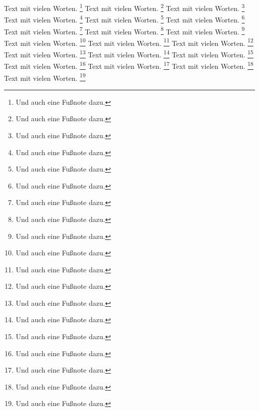 \documentclass{report}
\begin{document}
Text mit vielen Worten.%
\footnote{Und auch eine Fu\ss{}note dazu.}
Text mit vielen Worten.%
\footnote{Und auch eine Fu\ss{}note dazu.}
Text mit vielen Worten.%
\footnote{Und auch eine Fu\ss{}note dazu.}
Text mit vielen Worten.%
\footnote{Und auch eine Fu\ss{}note dazu.}
Text mit vielen Worten.%
\footnote{Und auch eine Fu\ss{}note dazu.}
Text mit vielen Worten.%
\footnote{Und auch eine Fu\ss{}note dazu.}
Text mit vielen Worten.%
\footnote{Und auch eine Fu\ss{}note dazu.}
Text mit vielen Worten.%
\footnote{Und auch eine Fu\ss{}note dazu.}
Text mit vielen Worten.%
\footnote{Und auch eine Fu\ss{}note dazu.}
Text mit vielen Worten.%
\footnote{Und auch eine Fu\ss{}note dazu.}
Text mit vielen Worten.%
\footnote{Und auch eine Fu\ss{}note dazu.}
Text mit vielen Worten.%
\footnote{Und auch eine Fu\ss{}note dazu.}
Text mit vielen Worten.%
\footnote{Und auch eine Fu\ss{}note dazu.}
Text mit vielen Worten.%
\footnote{Und auch eine Fu\ss{}note dazu.}
Text mit vielen Worten.%
\footnote{Und auch eine Fu\ss{}note dazu.}
Text mit vielen Worten.%
\footnote{Und auch eine Fu\ss{}note dazu.}
Text mit vielen Worten.%
\footnote{Und auch eine Fu\ss{}note dazu.}
Text mit vielen Worten.%
\footnote{Und auch eine Fu\ss{}note dazu.}
Text mit vielen Worten.%
\footnote{Und auch eine Fu\ss{}note dazu.}
\end{document}
